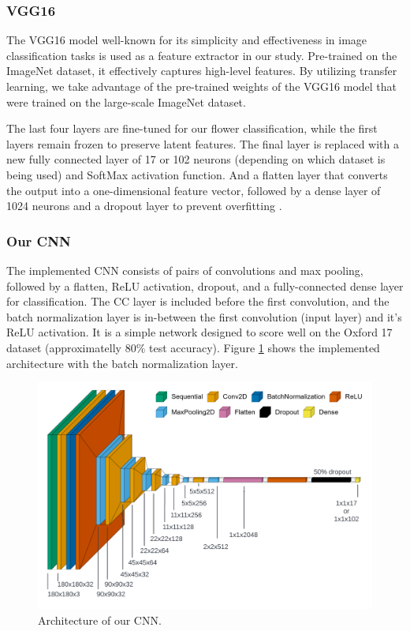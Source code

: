 \subsubsection{VGG16}
The VGG16 model \cite{SimonyanVGG} well-known for its simplicity and effectiveness in image classification tasks \cite{SimonyanVGG} is used as a feature extractor in our study. Pre-trained on the ImageNet dataset, it effectively captures high-level features.
By utilizing transfer learning, we take advantage of the pre-trained weights of the VGG16 model that were trained on the large-scale ImageNet dataset.

The last four layers are fine-tuned for our flower classification, while the first layers remain frozen to preserve latent features. The final layer is replaced with a new fully connected layer of 17 or 102 neurons (depending on which dataset is being used) and SoftMax activation function.
And a flatten layer that converts the output into a one-dimensional feature vector, followed by a dense layer of 1024 neurons and a dropout layer to prevent overfitting \cite{kaggle_flower_cnn}.

\subsubsection{Our CNN}

The implemented \gls{CNN} consists of pairs of convolutions and max pooling, followed by a flatten, ReLU activation, dropout, and a fully-connected dense layer for classification.
The \gls{CC} layer is included before the first convolution, and the batch normalization layer is in-between the first convolution (input layer) and it's ReLU activation.
It is a simple network designed to score well on the Oxford 17 dataset (approximatelly $80\%$ test accuracy). Figure \ref{fig:our_cnn} shows the implemented architecture with the batch normalization layer.


\begin{figure}[ht]
    \centering
    \includegraphics[width=\textwidth]{images/ours_architecture.png}
    \caption{Architecture of our CNN.}
    \label{fig:our_cnn}
\end{figure}